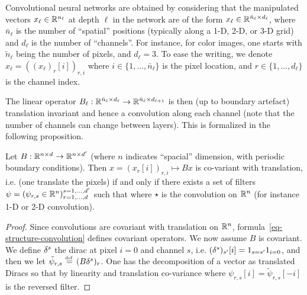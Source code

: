 Convolutional neural networks are obtained by considering that the manipulated vectors $x_\ell \in \mathbb{R}^{n_\ell}$ at depth $\ell$ in the network are of the form $x_\ell \in \mathbb{R}^{ \bar n_\ell \times d_\ell }$, where $\bar n_\ell$ is the number of ``spatial'' positions (typically along a 1-D, 2-D, or 3-D grid) and $d_\ell$ is the number of ``channels''.
%
For instance, for color images, one starts with $\tilde n_\ell$ being the number of pixels, and $d_\ell=3$.
%
To ease the writing, we denote $x_\ell = ( (x_\ell)_r[i] )_{r,i}$ where $i \in \{1,\ldots,\bar n_\ell\}$ is the pixel location, and $r \in \{1,\ldots,d_\ell\}$ is the channel index.

The linear operator $B_\ell : \mathbb{R}^{ \bar n_\ell \times d_\ell } \rightarrow \mathbb{R}^{ \bar n_\ell \times d_{\ell+1} }$ is then (up to boundary artefact) translation invariant and hence a convolution along each channel (note that the number of channels can change between layers). This is formalized in the following proposition.

\begin{prop}
	Let $B : \mathbb{R}^{n \times d} \rightarrow \mathbb{R}^{n \times d'}$ (where $n$ indicates ``spacial'' dimension, with periodic boundary conditions). Then $x = (x_r[i] )_{r,i} \mapsto B x$ is co-variant with translation, i.e. 
	(one translate the pixels) if and only if there exists a set of filters $\psi = ( \psi_{r,s} \in \mathbb{R}^n )_{r=1,\ldots,d}^{s=1,\ldots,d'}$ such that 
	where $\star$ is the convolution on $\mathbb{R}^n$ (for instance 1-D or 2-D convolution). 
\end{prop}

\begin{proof}
	Since convolutions are covariant with translation on $\mathbb{R}^n$, formula~\eqref{eq-structure-convolution} defines covariant operators.
	We now assume $B$ is covariant. We define $\delta^{s}$ the dirac at pixel $i=0$ and channel $s$, i.e. $(\delta^{s})_{s'}[i] = 1_{s=s'} 1_{i=0}$, and then we let $\tilde\psi_{r,s} \stackrel{\mbox{\upshape\tiny def.}}{=} (B \delta^s)_r$. One has the decomposition of a vector as translated Diracs
	so that by linearity and translation co-variance
	where $\psi_{r,s}[i] = \tilde \psi_{r,s}[-i]$ is the reversed filter. 
\end{proof}

